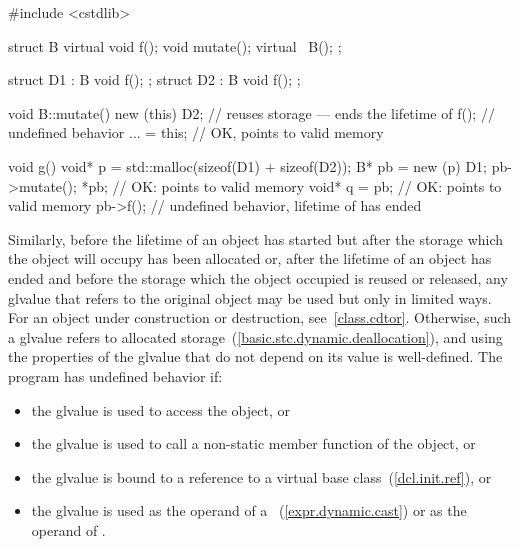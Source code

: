 \begin{example}
\begin{codeblock}
#include <cstdlib>

struct B {
  virtual void f();
  void mutate();
  virtual ~B();
};

struct D1 : B { void f(); };
struct D2 : B { void f(); };

void B::mutate() {
  new (this) D2;    // reuses storage --- ends the lifetime of 
  f();              // undefined behavior
  ... = this;       // OK,  points to valid memory
}

void g() {
  void* p = std::malloc(sizeof(D1) + sizeof(D2));
  B* pb = new (p) D1;
  pb->mutate();
  *pb;              // OK:  points to valid memory
  void* q = pb;     // OK:  points to valid memory
  pb->f();          // undefined behavior, lifetime of  has ended
}
\end{codeblock}
\end{example}

\pnum
Similarly, before the lifetime of an object has started but after the
storage which the object will occupy has been allocated or, after the
lifetime of an object has ended and before the storage which the object
occupied is reused or released, any glvalue that refers to the original
object may be used but only in limited ways.
For an object under construction or destruction, see~\ref{class.cdtor}.
Otherwise, such
a glvalue refers to
allocated storage~(\ref{basic.stc.dynamic.deallocation}), and using the
properties of the glvalue that do not depend on its value is
well-defined. The program has undefined behavior if:
\begin{itemize}
\item the glvalue is used to access the object, or
\item the glvalue is used to call a non-static member function of the object, or
\item the glvalue is bound to a reference to a virtual base class~(\ref{dcl.init.ref}), or
\item the glvalue is used as the operand of a
~(\ref{expr.dynamic.cast}) or as the operand of
.
\end{itemize}

